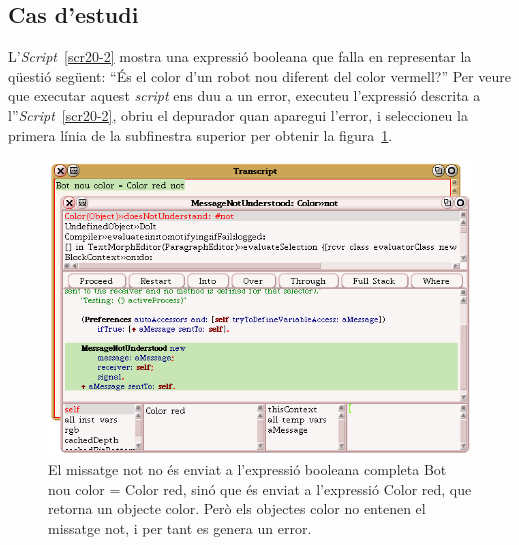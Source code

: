 \subsection{Cas d'estudi} 
L'\emph{Script}~\ref{scr20-2} mostra una expressió booleana que falla en representar la qüestió següent: ``És el color d'un robot nou diferent del color vermell?'' Per veure que executar aquest \emph{script} ens duu a un error, executeu l'expressió descrita a l''\emph{Script}~\ref{scr20-2}, obriu el depurador quan aparegui l'error, i seleccioneu la primera línia de la subfinestra superior per obtenir la figura~\ref{fig2001}.
\begin{figure}[h!]
\begin{center}
\includegraphics[scale=0.4]{Imatges/figura20-1.png}
\end{center}
\caption{El missatge \textsf{\upshape not} no és enviat a l'expressió booleana completa  \textsf{\upshape Bot nou color = Color red}, sinó que és enviat a l'expressió \textsf{\upshape Color red}, que retorna un objecte color. Però els objectes color no entenen el missatge  \textsf{\upshape not}, i per tant es genera un error.}
\label{fig2001}
\end{figure}


